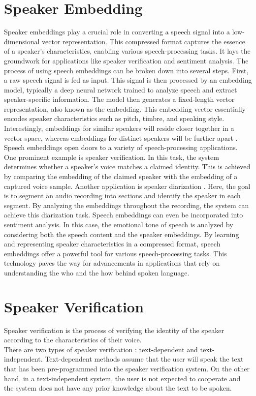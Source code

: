 \section{Speaker Embedding}
Speaker embeddings play a crucial role in converting a speech signal into a low-dimensional vector representation. This compressed format captures the essence of a speaker's characteristics, enabling various speech-processing tasks. It lays the groundwork for applications like speaker verification and sentiment analysis.
The process of using speech embeddings can be broken down into several steps. First, a raw speech signal is fed as input. This signal is then processed by an embedding model, typically a deep neural network trained to analyze speech and extract speaker-specific information. The model then generates a fixed-length vector representation, also known as the embedding. This embedding vector essentially encodes speaker characteristics such as pitch, timbre, and speaking style. Interestingly, embeddings for similar speakers will reside closer together in a vector space, whereas embeddings for distinct speakers will be further apart \cite{li2022speakerrepresentationlearningcontrastive}.
Speech embeddings open doors to a variety of speech-processing applications. One prominent example is speaker verification. In this task, the system determines whether a speaker's voice matches a claimed identity. This is achieved by comparing the embedding of the claimed speaker with the embedding of a captured voice sample. Another application is speaker diarization \cite{kwon2021adaptingspeakerembeddingsspeaker}. Here, the goal is to segment an audio recording into sections and identify the speaker in each segment. By analyzing the embeddings throughout the recording, the system can achieve this diarization task. Speech embeddings can even be incorporated into sentiment analysis. In this case, the emotional tone of speech is analyzed by considering both the speech content and the speaker embeddings.
By learning and representing speaker characteristics in a compressed format, speech embeddings offer a powerful tool for various speech-processing tasks. This technology paves the way for advancements in applications that rely on understanding the who and the how behind spoken language.

\section{Speaker Verification}
Speaker verification is the process of verifying the identity of the speaker according to the characteristics of their voice. \\
There are two types of speaker verification \cite{itsp2022}: text-dependent and text-independent. Text-dependent methods assume that the user will speak the text that has been pre-programmed into the speaker verification system. On the other hand, in a text-independent system, the user is not expected to cooperate and the system does not have any prior knowledge about the text to be spoken.

